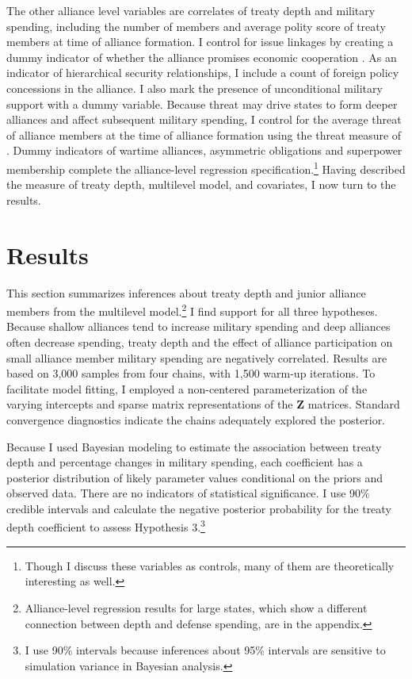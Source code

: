 \documentclass[12pt]{article}
\begin{document}
 
The other alliance level variables are correlates of treaty depth and military spending, including the number of members and average polity score of treaty members at time of alliance formation. 
I control for issue linkages by creating a dummy indicator of whether the alliance promises economic cooperation \citep{Poast2013, LongLeeds2006}. 
As an indicator of hierarchical security relationships, I include a count of foreign policy concessions in the alliance. 
I also mark the presence of unconditional military support with a dummy variable. 
Because threat may drive states to form deeper alliances and affect subsequent military spending, I control for the average threat of alliance members at the time of alliance formation using the threat measure of \citet{LeedsSavun2007}. 
Dummy indicators of wartime alliances, asymmetric obligations \citep{Leedsetal2002} and superpower membership complete the alliance-level regression specification.\footnote{Though I discuss these variables as controls, many of them are theoretically interesting as well.}  
Having described the measure of treaty depth, multilevel model, and covariates, I now turn to the results. 

 

\section{Results}


This section summarizes inferences about treaty depth and junior alliance members from the multilevel model.\footnote{Alliance-level regression results for large states, which show a different connection between depth and defense spending, are in the appendix.}
I find support for all three hypotheses. 
Because shallow alliances tend to increase military spending and deep alliances often decrease spending, treaty depth and the effect of alliance participation on small alliance member military spending are negatively correlated. 
Results are based on 3,000 samples from four chains, with 1,500 warm-up iterations. 
To facilitate model fitting, I employed a non-centered parameterization of the varying intercepts and sparse matrix representations of the \textbf{Z} matrices. 
Standard convergence diagnostics indicate the chains adequately explored the posterior.


Because I used Bayesian modeling to estimate the association between treaty depth and percentage changes in military spending, each coefficient has a posterior distribution of likely parameter values conditional on the priors and observed data.
There are no indicators of statistical significance. 
I use 90\% credible intervals and calculate the negative posterior probability for the treaty depth coefficient to assess Hypothesis 3.\footnote{I use 90\% intervals because inferences about 95\% intervals are sensitive to simulation variance in Bayesian analysis.}
\end{document}
